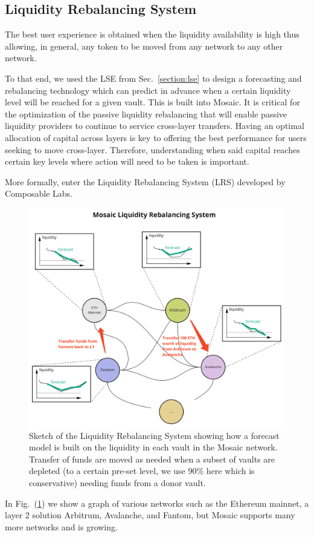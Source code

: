 \subsection{Liquidity Rebalancing System\label{section:lrs}}

The best user experience is obtained when the liquidity availability is high thus allowing, in general, any token to be moved from any network to any other network.

To that end, we used the LSE from Sec.~\ref{section:lse} to design a forecasting and rebalancing technology which can predict in advance when a certain liquidity level will be reached for a given vault. This is built into Mosaic.
%
It is critical for the optimization of the passive liquidity rebalancing that will enable passive liquidity providers to continue to service cross-layer transfers.
%
Having an optimal allocation of capital across layers is key to offering the best performance for users seeking to move cross-layer. Therefore, understanding when said capital reaches certain key levels where action will need to be taken is important.

More formally, enter the Liquidity Rebalancing System (LRS) developed by Composable Labs.
%
\begin{figure}
    \centering
    \includegraphics[scale=0.22]{images/lrs.pdf}
    \caption{Sketch of the Liquidity Rebalancing System showing how a forecast model is built on the liquidity in each vault in the Mosaic network. Transfer of funds are moved as needed when a subset of vaults are depleted (to a certain pre-set level, we use 90\% here which is conservative) needing funds from a donor vault.}
    \label{fig:lrs}
\end{figure}
%
In Fig.~(\ref{fig:lrs}) we show a graph of various networks such as the Ethereum mainnet, a layer 2 solution Arbitrum, Avalanche, and Fantom, but Mosaic supports many more networks and is growing.

